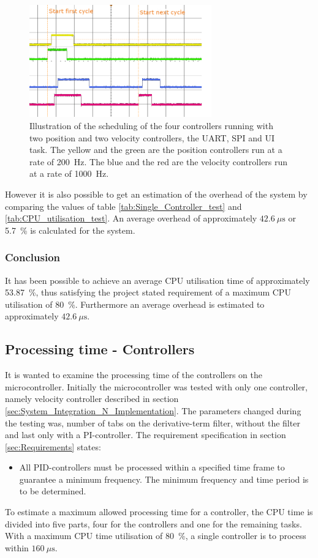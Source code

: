 \documentclass[../../main.tex]{subfiles}
\begin{document}
\begin{figure}
    \centering
    \includegraphics[width=0.7\textwidth]{Sections/Test/Images/Four_controllers_revised-white.png}
    \caption{Illustration of the scheduling of the four controllers running with two position and two velocity controllers, the UART, SPI and UI task. The yellow and the green are the position controllers run at a rate of \SI{200}{\hertz}. The blue and the red are the velocity controllers run at a rate of \SI{1000}{\hertz}.}
    \label{fig:Schedueling_controllers}
\end{figure}

However it is also possible to get an estimation of the overhead of the system by comparing the values of table \ref{tab:Single_Controller_test} and \ref{tab:CPU_utilisation_test}. An average overhead of approximately $\SI{42,6}{\mu\second}$ or \SI{5,7}{\percent} is calculated for the system.

\subsubsection*{Conclusion}
It has been possible to achieve an average CPU utilisation time of approximately \SI{ 53,87}{\percent}, thus satisfying the project stated requirement of a maximum CPU utilisation of \SI{80}{\percent}. Furthermore an average overhead is estimated to approximately $\SI{42,6}{\mu\second}$.

\subsection{Processing time - Controllers}
It is wanted to examine the processing time of the controllers on the microcontroller. Initially the microcontroller was tested with only one controller, namely velocity controller described in section \ref{sec:System_Integration_N_Implementation}. The parameters changed during the testing was, number of tabs on the derivative-term filter, without the filter and last only with a PI-controller.  The requirement specification in section \ref{sec:Requirements} states:
\begin{itemize}
    \item All PID-controllers must be processed within a specified time frame to guarantee a minimum frequency. The minimum frequency and time period is to be determined.
\end{itemize}
To estimate a maximum allowed processing time for a controller, the CPU time is divided into five parts, four for the controllers and one for the remaining tasks. With a maximum CPU time utilisation of \SI{80}{\percent}, a single controller is to process within $\SI{160}{\mu\second}$.
\end{document}
